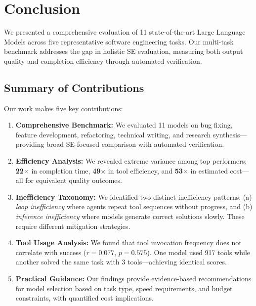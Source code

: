 \section{Conclusion}
\label{sec:conclusion}

We presented a comprehensive evaluation of 11 state-of-the-art Large Language Models across five representative software engineering tasks. Our multi-task benchmark addresses the gap in holistic SE evaluation, measuring both output quality and completion efficiency through automated verification.

\subsection{Summary of Contributions}

Our work makes five key contributions:

\begin{enumerate}
    \item \textbf{Comprehensive Benchmark:} We evaluated 11 models on bug fixing, feature development, refactoring, technical writing, and research synthesis---providing broad SE-focused comparison with automated verification.

    \item \textbf{Efficiency Analysis:} We revealed extreme variance among top performers: \textbf{22$\times$} in completion time, \textbf{49$\times$} in tool efficiency, and \textbf{53$\times$} in estimated cost---all for equivalent quality outcomes.

    \item \textbf{Inefficiency Taxonomy:} We identified two distinct inefficiency patterns: (a) \textit{loop inefficiency} where agents repeat tool sequences without progress, and (b) \textit{inference inefficiency} where models generate correct solutions slowly. These require different mitigation strategies.

    \item \textbf{Tool Usage Analysis:} We found that tool invocation frequency does not correlate with success ($r=0.077$, $p=0.575$). One model used 917 tools while another solved the same task with 3 tools---achieving identical scores.

    \item \textbf{Practical Guidance:} Our findings provide evidence-based recommendations for model selection based on task type, speed requirements, and budget constraints, with quantified cost implications.
\end{enumerate}


